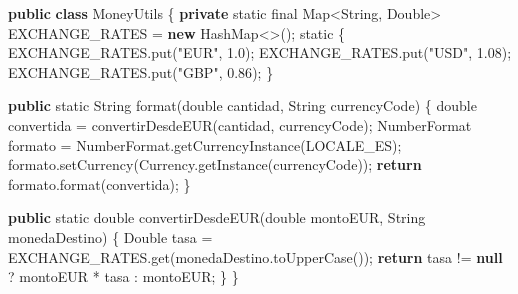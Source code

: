 \documentclass[
  spanish,
  11pt,
  paper=a4,
  ,captions=tableheading
]{scrartcl}
\newenvironment{Shaded}{}{}
\newcommand{\BuiltInTok}[1]{\textcolor[rgb]{0.00,0.50,0.00}{#1}}
\newcommand{\ControlFlowTok}[1]{\textcolor[rgb]{0.00,0.44,0.13}{\textbf{#1}}}
\newcommand{\DataTypeTok}[1]{\textcolor[rgb]{0.56,0.13,0.00}{#1}}
\newcommand{\FloatTok}[1]{\textcolor[rgb]{0.25,0.63,0.44}{#1}}
\newcommand{\FunctionTok}[1]{\textcolor[rgb]{0.02,0.16,0.49}{#1}}
\newcommand{\KeywordTok}[1]{\textcolor[rgb]{0.00,0.44,0.13}{\textbf{#1}}}
\newcommand{\NormalTok}[1]{#1}
\newcommand{\OperatorTok}[1]{\textcolor[rgb]{0.40,0.40,0.40}{#1}}
\newcommand{\StringTok}[1]{\textcolor[rgb]{0.25,0.44,0.63}{#1}}
\begin{document}
\begin{Shaded}
\begin{Highlighting}[]
\KeywordTok{public} \KeywordTok{class}\NormalTok{ MoneyUtils }\OperatorTok{\{}
    \KeywordTok{private} \DataTypeTok{static} \DataTypeTok{final} \BuiltInTok{Map}\OperatorTok{\textless{}}\BuiltInTok{String}\OperatorTok{,} \BuiltInTok{Double}\OperatorTok{\textgreater{}}\NormalTok{ EXCHANGE\_RATES }\OperatorTok{=} \KeywordTok{new} \BuiltInTok{HashMap}\OperatorTok{\textless{}\textgreater{}();}
    \DataTypeTok{static} \OperatorTok{\{}
\NormalTok{        EXCHANGE\_RATES}\OperatorTok{.}\FunctionTok{put}\OperatorTok{(}\StringTok{"EUR"}\OperatorTok{,} \FloatTok{1.0}\OperatorTok{);}
\NormalTok{        EXCHANGE\_RATES}\OperatorTok{.}\FunctionTok{put}\OperatorTok{(}\StringTok{"USD"}\OperatorTok{,} \FloatTok{1.08}\OperatorTok{);}
\NormalTok{        EXCHANGE\_RATES}\OperatorTok{.}\FunctionTok{put}\OperatorTok{(}\StringTok{"GBP"}\OperatorTok{,} \FloatTok{0.86}\OperatorTok{);}
    \OperatorTok{\}}

    \KeywordTok{public} \DataTypeTok{static} \BuiltInTok{String} \FunctionTok{format}\OperatorTok{(}\DataTypeTok{double}\NormalTok{ cantidad}\OperatorTok{,} \BuiltInTok{String}\NormalTok{ currencyCode}\OperatorTok{)} \OperatorTok{\{}
        \DataTypeTok{double}\NormalTok{ convertida }\OperatorTok{=} \FunctionTok{convertirDesdeEUR}\OperatorTok{(}\NormalTok{cantidad}\OperatorTok{,}\NormalTok{ currencyCode}\OperatorTok{);}
        \BuiltInTok{NumberFormat}\NormalTok{ formato }\OperatorTok{=} \BuiltInTok{NumberFormat}\OperatorTok{.}\FunctionTok{getCurrencyInstance}\OperatorTok{(}\NormalTok{LOCALE\_ES}\OperatorTok{);}
\NormalTok{        formato}\OperatorTok{.}\FunctionTok{setCurrency}\OperatorTok{(}\BuiltInTok{Currency}\OperatorTok{.}\FunctionTok{getInstance}\OperatorTok{(}\NormalTok{currencyCode}\OperatorTok{));}
        \ControlFlowTok{return}\NormalTok{ formato}\OperatorTok{.}\FunctionTok{format}\OperatorTok{(}\NormalTok{convertida}\OperatorTok{);}
    \OperatorTok{\}}

    \KeywordTok{public} \DataTypeTok{static} \DataTypeTok{double} \FunctionTok{convertirDesdeEUR}\OperatorTok{(}\DataTypeTok{double}\NormalTok{ montoEUR}\OperatorTok{,} \BuiltInTok{String}\NormalTok{ monedaDestino}\OperatorTok{)} \OperatorTok{\{}
        \BuiltInTok{Double}\NormalTok{ tasa }\OperatorTok{=}\NormalTok{ EXCHANGE\_RATES}\OperatorTok{.}\FunctionTok{get}\OperatorTok{(}\NormalTok{monedaDestino}\OperatorTok{.}\FunctionTok{toUpperCase}\OperatorTok{());}
        \ControlFlowTok{return}\NormalTok{ tasa }\OperatorTok{!=} \KeywordTok{null} \OperatorTok{?}\NormalTok{ montoEUR }\OperatorTok{*}\NormalTok{ tasa }\OperatorTok{:}\NormalTok{ montoEUR}\OperatorTok{;}
    \OperatorTok{\}}
\OperatorTok{\}}
\end{Highlighting}
\end{Shaded}
\end{document}
